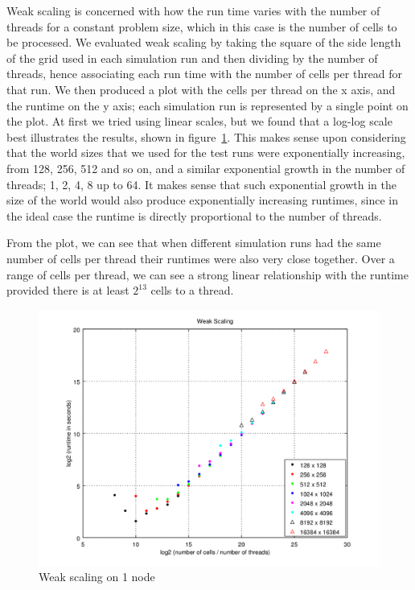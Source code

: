\documentclass[a4paper]{article}
\begin{document}
Weak scaling is concerned with how the run time varies with the number of threads for a constant problem size, which in this case is the number of cells to be processed.
We evaluated weak scaling by taking the square of the side length of the grid used in each simulation run and then dividing by the number of threads, hence associating each run time with the number of cells per thread for that run.
We then produced a plot with the cells per thread on the x axis, and the runtime on the y axis; each simulation run is represented by a single point on the plot.
At first we tried using linear scales, but we found that a log-log scale best illustrates the results, shown in figure~\ref{weakscaling}.
This makes sense upon considering that the world sizes that we used for the test runs were exponentially increasing, from 128, 256, 512 and so on, and a similar exponential growth in the number of threads; 1, 2, 4, 8 up to 64.
It makes sense that such exponential growth in the size of the world would also produce exponentially increasing runtimes, since in the ideal case the runtime is directly proportional to the number of threads.

From the plot, we can see that when different simulation runs had the same number of cells per thread their runtimes were also very close together.
Over a range of cells per thread, we can see a strong linear relationship with the runtime provided there is at least $2^{13}$ cells to a thread.

\begin{figure}
    \centering
    \includegraphics[width=\textwidth]{weak-scaling}
    \caption{Weak scaling on 1 node}
	\label{weakscaling}
\end{figure}
\end{document}
